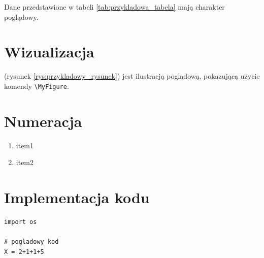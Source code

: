 Dane przedstawione w tabeli \ref{tab:przykladowa_tabela} mają charakter poglądowy.

\section{Wizualizacja}




(rysunek \ref{rys:przykladowy_rysunek}) jest ilustracją poglądową, pokazującą użycie komendy \texttt{\textbackslash MyFigure}.


\section{Numeracja}

\begin{enumerate}
    \item item1

    \item item2
\end{enumerate}

\section{Implementacja kodu }
\begin{lstlisting}[style=pythonstyle, caption={Przykład zastosowania }, label={code:przyklad}]
import os

# pogladowy kod
X = 2+1+1+5
\end{lstlisting}

\clearpage
